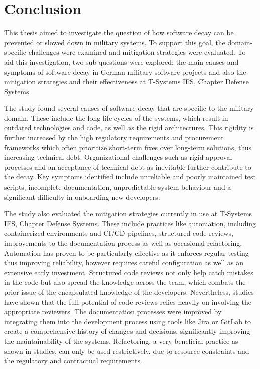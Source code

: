 \section{Conclusion}
This thesis aimed to investigate the question of how software decay can be prevented or slowed down in military systems. To support this goal, the domain-specific challenges were examined and mitigation strategies were evaluated.
To aid this investigation, two sub-questions were explored: the main causes and symptoms of software decay in German military software projects and also the mitigation strategies and their effectiveness at T-Systems IFS, Chapter Defense Systems.

The study found several causes of software decay that are specific to the military domain. These include the long life cycles of the systems, which result in outdated technologies and code, as well as the rigid architectures. This rigidity is further
increased by the high regulatory requirements and procurement frameworks which often prioritize short-term fixes over long-term solutions, thus increasing technical debt. Organizational challenges such as rigid approval processes
and an acceptance of technical debt as inevitable further contribute to the decay. Key symptoms identified include unreliable and poorly maintained test scripts, incomplete documentation, unpredictable system behaviour and a significant difficulty in onboarding new developers.

The study also evaluated the mitigation strategies currently in use at T-Systems IFS, Chapter Defense Systems. These include practices like automation, including containerized environments and CI/CD pipelines,
structured code reviews, improvements to the documentation process as well as occasional refactoring. Automation has proven to be particularly effective as it enforces regular testing thus improving reliability, however requires careful configuration as well as an extensive early investment.
Structured code reviews not only help catch mistakes in the code but also spread the knowledge across the team, which combats the prior issue of the encapsulated knowledge of the developers. Nevertheless, studies have shown that the full potential of code reviews relies heavily on involving the appropriate reviewers.
The documentation processes were improved by integrating them into the development process using tools like Jira or GitLab to create a comprehensive history of changes and decisions, significantly improving the maintainability of the systems.
Refactoring, a very beneficial practice as shown in studies, can only be used restrictively, due to resource constraints and the regulatory and contractual requirements.

